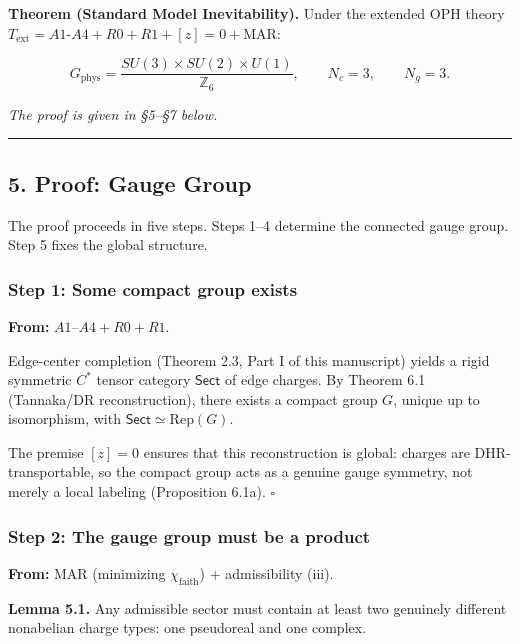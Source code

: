 \textbf{Theorem (Standard Model Inevitability).} Under the extended OPH theory \(T_{\mathrm{ext}} = A1\text{-}A4 + R0 + R1 + [z]=0 + \mathrm{MAR}\):

\[G_{\mathrm{phys}} = \frac{SU(3) \times SU(2) \times U(1)}{\mathbb{Z}_6}, \qquad N_c = 3, \qquad N_g = 3.\]

\emph{The proof is given in §5--§7 below.}

\begin{center}\rule{0.5\linewidth}{0.5pt}\end{center}

\subsection{5. Proof: Gauge Group}\label{5-proof-gauge-group}

The proof proceeds in five steps. Steps 1--4 determine the connected gauge group. Step 5 fixes the global structure.

\subsubsection{Step 1: Some compact group exists}\label{step-1-some-compact-group-exists}

\textbf{From:} \(A1\)--\(A4 + R0 + R1\).

Edge-center completion (Theorem 2.3, Part I of this manuscript) yields a rigid symmetric \(C^*\) tensor category \(\mathsf{Sect}\) of edge charges. By Theorem 6.1 (Tannaka/DR reconstruction), there exists a compact group \(G\), unique up to isomorphism, with \(\mathsf{Sect} \simeq \mathrm{Rep}(G)\).

The premise \([z] = 0\) ensures that this reconstruction is global: charges are DHR-transportable, so the compact group acts as a genuine gauge symmetry, not merely a local labeling (Proposition 6.1a). \(\square\)

\subsubsection{Step 2: The gauge group must be a product}\label{step-2-the-gauge-group-must-be-a-product}

\textbf{From:} MAR (minimizing \(\chi_{\mathrm{faith}}\)) + admissibility (iii).

\textbf{Lemma 5.1.} Any admissible sector must contain at least two genuinely different nonabelian charge types: one pseudoreal and one complex.

